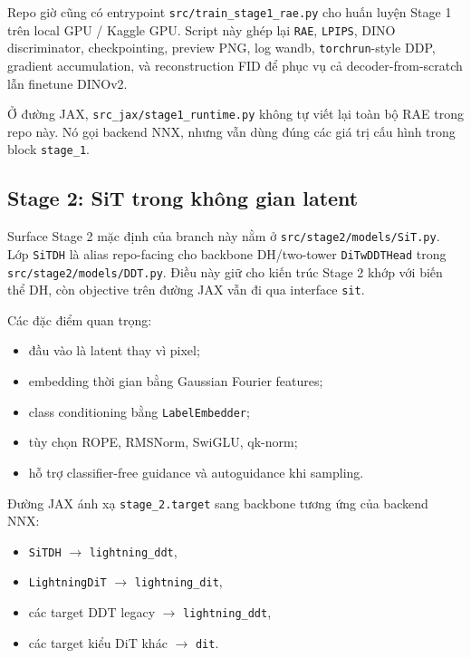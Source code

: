 Repo giờ cũng có entrypoint \texttt{src/train\_stage1\_rae.py} cho huấn luyện
Stage 1 trên local GPU / Kaggle GPU. Script này ghép lại \texttt{RAE},
\texttt{LPIPS}, DINO discriminator, checkpointing, preview PNG, log wandb,
\texttt{torchrun}-style DDP, gradient accumulation, và reconstruction FID để
phục vụ cả decoder-from-scratch lẫn finetune DINOv2.

Ở đường JAX, \texttt{src\_jax/stage1\_runtime.py} không tự viết lại toàn bộ RAE
trong repo này. Nó gọi backend NNX, nhưng vẫn dùng đúng các giá trị cấu hình
trong block \texttt{stage\_1}.

\subsection{Stage 2: SiT trong không gian latent}

Surface Stage 2 mặc định của branch này nằm ở \texttt{src/stage2/models/SiT.py}.
Lớp \texttt{SiTDH} là alias repo-facing cho backbone DH/two-tower
\texttt{DiTwDDTHead} trong \texttt{src/stage2/models/DDT.py}. Điều này giữ cho
kiến trúc Stage 2 khớp với biến thể DH, còn objective trên đường JAX vẫn đi qua
interface \texttt{sit}.

Các đặc điểm quan trọng:

\begin{itemize}[leftmargin=1.5em]
  \item đầu vào là latent thay vì pixel;
  \item embedding thời gian bằng Gaussian Fourier features;
  \item class conditioning bằng \texttt{LabelEmbedder};
  \item tùy chọn ROPE, RMSNorm, SwiGLU, qk-norm;
  \item hỗ trợ classifier-free guidance và autoguidance khi sampling.
\end{itemize}

Đường JAX ánh xạ \texttt{stage\_2.target} sang backbone tương ứng của backend
NNX:

\begin{itemize}[leftmargin=1.5em]
  \item \texttt{SiTDH} $\rightarrow$ \texttt{lightning\_ddt},
  \item \texttt{LightningDiT} $\rightarrow$ \texttt{lightning\_dit},
  \item các target DDT legacy $\rightarrow$ \texttt{lightning\_ddt},
  \item các target kiểu DiT khác $\rightarrow$ \texttt{dit}.
\end{itemize}


